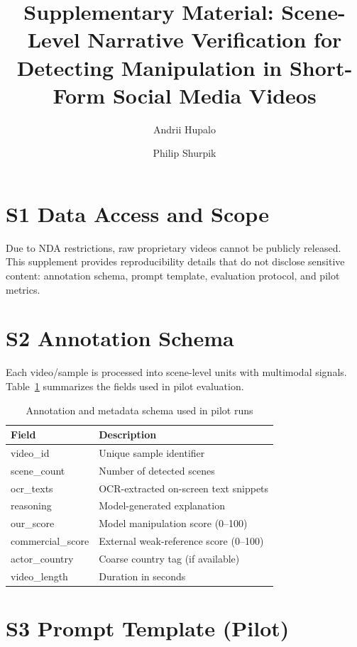 \documentclass[runningheads]{llncs}
\begin{document}
\title{Supplementary Material: Scene-Level Narrative Verification for Detecting Manipulation in Short-Form Social Media Videos}
\author{Andrii Hupalo \and Philip Shurpik}
\maketitle

\section*{S1 Data Access and Scope}

Due to NDA restrictions, raw proprietary videos cannot be publicly released. This supplement provides reproducibility details that do not disclose sensitive content: annotation schema, prompt template, evaluation protocol, and pilot metrics.

\section*{S2 Annotation Schema}

Each video/sample is processed into scene-level units with multimodal signals. Table~\ref{tab:schema} summarizes the fields used in pilot evaluation.

\begin{table}[h]
\centering
\caption{Annotation and metadata schema used in pilot runs}
\label{tab:schema}
\footnotesize
\begin{tabular}{ll}
\toprule
\textbf{Field} & \textbf{Description} \\
\midrule
video\_id & Unique sample identifier \\
scene\_count & Number of detected scenes \\
ocr\_texts & OCR-extracted on-screen text snippets \\
reasoning & Model-generated explanation \\
our\_score & Model manipulation score (0--100) \\
commercial\_score & External weak-reference score (0--100) \\
actor\_country & Coarse country tag (if available) \\
video\_length & Duration in seconds \\
\bottomrule
\end{tabular}
\end{table}

\section*{S3 Prompt Template (Pilot)}
\end{document}
